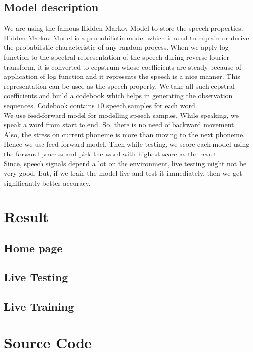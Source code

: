 \documentclass{article}
\begin{document}
\subsection{Model description}
We are using the famous Hidden Markov Model to store the speech properties. Hidden Markov Model is a probabilistic model which is used to explain or derive the probabilistic characteristic of any random process. When we apply log function to the spectral representation of the speech during reverse fourier transform, it is converted to cepstrum whose coefficients are steady because of application of log function and it represents the speech is a nice manner. This representation can be used as the speech property. We take all such cepstral coefficients and build a codebook which helps in generating the observation sequences. Codebook contains $10$ speech samples for each word.\\
We use feed-forward model for modelling speech samples. While speaking, we speak a word from start to end. So, there is no need of backward movement. Also, the stress on current phoneme is more than moving to the next phoneme. Hence we use feed-forward model. Then while testing, we score each model using the forward process and pick the word with highest score as the result.\\
Since, speech signals depend a lot on the environment, live testing might not be very good. But, if we train the model live and test it immediately, then we get significantly better accuracy.
\section{Result}
\subsection{Home page}

\subsection{Live Testing}

\subsection{Live Training}

\section{Source Code}
\end{document}
